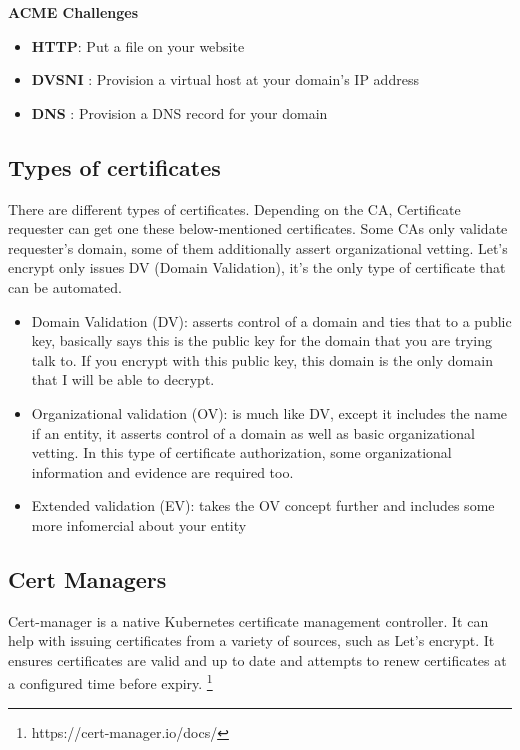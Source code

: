 \textbf{ACME Challenges}  

\begin{itemize}
    


\item \textbf{HTTP}: Put a file on your website   
\item \textbf{DVSNI} : Provision a virtual host at your domain’s IP address  
\item \textbf{DNS} : Provision a DNS record for your domain

\end{itemize}
\subsection{Types of certificates }
There are different types of certificates. Depending on the CA, Certificate requester can get one these below-mentioned certificates. Some CAs only validate requester's domain, some of them additionally assert  organizational vetting. Let’s encrypt only issues DV (Domain Validation), it’s the only type of certificate that can be automated.
\begin{itemize}
    

\item Domain Validation (DV): asserts control of a domain and ties that to a public key, basically says this is the public key for the domain that you are trying talk to. If you encrypt with this public key, this domain is the only domain that I will be able to decrypt. 

\item Organizational validation (OV): is much like DV, except it includes the name if an entity, it asserts control of a domain as well as basic organizational vetting.  In this type of certificate authorization, some organizational information and evidence are required too. 


\item Extended validation (EV): takes the OV concept further and includes some more infomercial about your entity
\end{itemize}



\subsection{Cert Managers} 

 Cert-manager is a native Kubernetes certificate management controller. It can help with issuing certificates from a variety of sources, such as Let’s encrypt. It ensures certificates are valid and up to date and attempts to renew certificates at a configured time before expiry. \footnote{https://cert-manager.io/docs/}

